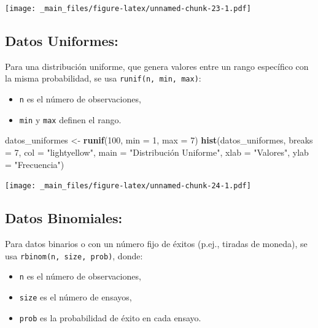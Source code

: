 \documentclass[
]{book}
\newenvironment{Shaded}{\begin{snugshade}}{\end{snugshade}}
\newcommand{\AttributeTok}[1]{\textcolor[rgb]{0.13,0.29,0.53}{#1}}
\newcommand{\DecValTok}[1]{\textcolor[rgb]{0.00,0.00,0.81}{#1}}
\newcommand{\FunctionTok}[1]{\textcolor[rgb]{0.13,0.29,0.53}{\textbf{#1}}}
\newcommand{\NormalTok}[1]{#1}
\newcommand{\OtherTok}[1]{\textcolor[rgb]{0.56,0.35,0.01}{#1}}
\newcommand{\StringTok}[1]{\textcolor[rgb]{0.31,0.60,0.02}{#1}}
\providecommand{\tightlist}{%
  \setlength{\itemsep}{0pt}\setlength{\parskip}{0pt}}
\begin{document}
\texttt{[image: \_main\_files/figure-latex/unnamed-chunk-23-1.pdf]}

\hypertarget{datos-uniformes}{%
\subsection{Datos Uniformes:}\label{datos-uniformes}}

Para una distribución uniforme, que genera valores entre un rango específico con la misma probabilidad, se usa \texttt{runif(n,\ min,\ max)}:

\begin{itemize}
\tightlist
\item
  \texttt{n} es el número de observaciones,\\
\item
  \texttt{min} y \texttt{max} definen el rango.
\end{itemize}

\begin{Shaded}
\begin{Highlighting}[]
\NormalTok{datos\_uniformes }\OtherTok{\textless{}{-}} \FunctionTok{runif}\NormalTok{(}\DecValTok{100}\NormalTok{, }\AttributeTok{min =} \DecValTok{1}\NormalTok{, }\AttributeTok{max =} \DecValTok{7}\NormalTok{)}
\FunctionTok{hist}\NormalTok{(datos\_uniformes, }
     \AttributeTok{breaks =} \DecValTok{7}\NormalTok{, }
     \AttributeTok{col =} \StringTok{"lightyellow"}\NormalTok{, }
     \AttributeTok{main =} \StringTok{"Distribución Uniforme"}\NormalTok{, }
     \AttributeTok{xlab =} \StringTok{"Valores"}\NormalTok{,}
     \AttributeTok{ylab =} \StringTok{"Frecuencia"}\NormalTok{)}
\end{Highlighting}
\end{Shaded}

\texttt{[image: \_main\_files/figure-latex/unnamed-chunk-24-1.pdf]}

\hypertarget{datos-binomiales}{%
\subsection{Datos Binomiales:}\label{datos-binomiales}}

Para datos binarios o con un número fijo de éxitos (p.ej., tiradas de moneda), se usa \texttt{rbinom(n,\ size,\ prob)}, donde:

\begin{itemize}
\tightlist
\item
  \texttt{n} es el número de observaciones,\\
\item
  \texttt{size} es el número de ensayos,\\
\item
  \texttt{prob} es la probabilidad de éxito en cada ensayo.
\end{itemize}
\end{document}
